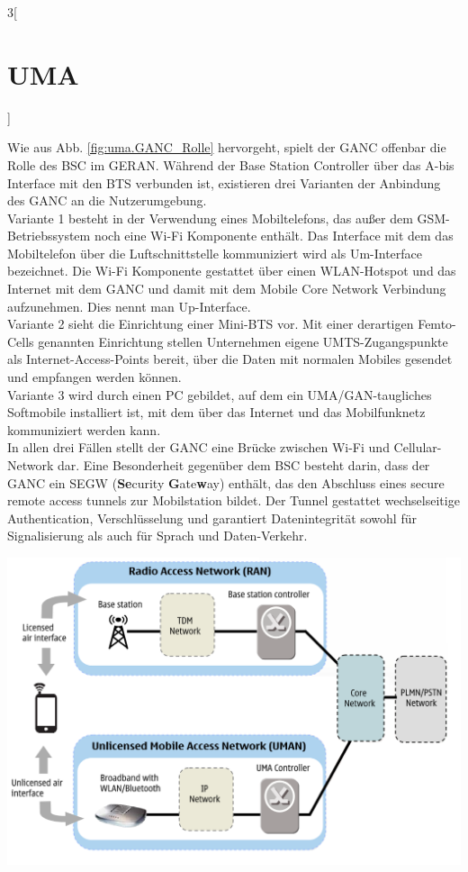 \begin{multicols}{3}[\section{UMA}]
\begin{Figure}
\label{fig:uma.GANC_Rolle}
\end{Figure}
Wie aus Abb. \ref{fig:uma.GANC_Rolle} hervorgeht, spielt der GANC offenbar die Rolle des BSC im GERAN. Während der Base Station Controller über das A-bis Interface mit den BTS verbunden ist, existieren drei Varianten der Anbindung des GANC an die Nutzerumgebung.\\
Variante 1 besteht in der Verwendung eines Mobiltelefons, das außer dem GSM-Betriebssystem noch eine Wi-Fi Komponente enthält. Das Interface mit dem
das Mobiltelefon über die Luftschnittstelle kommuniziert wird als Um-Interface bezeichnet. Die Wi-Fi Komponente gestattet über einen WLAN-Hotspot und das Internet mit dem GANC und damit mit dem Mobile Core Network Verbindung aufzunehmen. Dies nennt man Up-Interface.\\
Variante 2 sieht die Einrichtung einer Mini-BTS vor. Mit einer derartigen Femto-Cells genannten Einrichtung stellen Unternehmen eigene UMTS-Zugangspunkte als Internet-Access-Points bereit, über die Daten mit normalen Mobiles gesendet und empfangen werden können.\\
Variante 3 wird durch einen PC gebildet, auf dem ein UMA/GAN-taugliches Softmobile installiert ist, mit dem über das Internet und das Mobilfunknetz kommuniziert werden kann.\\
In allen drei Fällen stellt der GANC eine Brücke zwischen Wi-Fi und Cellular-Network dar. Eine Besonderheit gegenüber dem BSC besteht darin, dass der GANC ein SEGW (\textbf{Se}curity \textbf{G}ate\textbf{w}ay) enthält, das den Abschluss eines secure remote access tunnels zur Mobilstation bildet. Der Tunnel gestattet wechselseitige Authentication, Verschlüsselung und garantiert Datenintegrität sowohl für Signalisierung als auch für Sprach und Daten-Verkehr.
\begin{Figure}
\includegraphics[width=\linewidth]{Kapitel/UMA/Grafiken/UMAN.png}
\label{fig:uma.UMAN}
\end{Figure}

\end{multicols}
